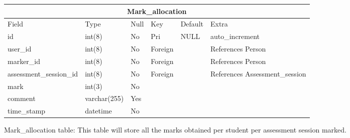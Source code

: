 \begin{table}[ht]
\begin{tabular}[c]{|p{3cm}||p{2.1cm}||p{1.2cm}||p{1.5cm}||p{2cm}|p{4cm}|}
  \hline
  \multicolumn{6}{|c|}{Mark\_allocation} \\
  \hline 
  Field & Type & Null & Key & Default & Extra \\ [0.5ex] %
  \hline
  id & int(8) & No & Pri & NULL & auto\_increment \\
  user\_id & int(8) & No & Foreign & & References Person\\
  marker\_id & int(8) & No & Foreign & & References Person\\
  assessment\_session\_id & int(8) & No & Foreign & & References Assessment\_session \\
  mark & int(3) & No & & & \\
  comment & varchar(255) & Yes & & & \\
  time\_stamp & datetime & No & & & \\
  \hline
\end{tabular}
\end{table} 

Mark\_allocation table:
This table will store all the marks obtained per student per assessment session marked.


